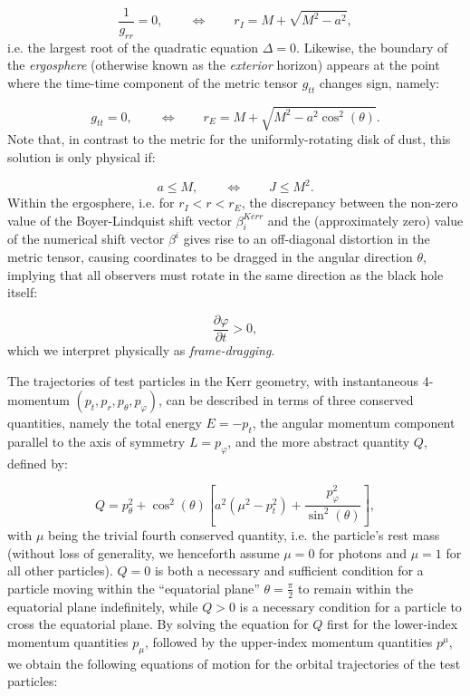 \documentclass{article}
\begin{document}
\begin{equation}
\frac{1}{g_{r r}} = 0, \qquad \iff \qquad r_I = M + \sqrt{M^2 - a^2},
\end{equation}
i.e. the largest root of the quadratic equation ${\Delta = 0}$. Likewise, the boundary of the \textit{ergosphere} (otherwise known as the \textit{exterior} horizon) appears at the point where the time-time component of the metric tensor ${g_{t t}}$ changes sign, namely:

\begin{equation}
g_{t t} = 0, \qquad \iff \qquad r_E = M + \sqrt{M^2 - a^2 \cos^2 \left( \theta \right)}.
\end{equation}
Note that, in contrast to the metric for the uniformly-rotating disk of dust, this solution is only physical if:

\begin{equation}
a \leq M, \qquad \iff \qquad J \leq M^2.
\end{equation}
Within the ergosphere, i.e. for ${r_I < r < r_E}$, the discrepancy between the non-zero value of the Boyer-Lindquist shift vector ${\beta_{i}^{Kerr}}$ and the (approximately zero) value of the numerical shift vector ${\beta^i}$ gives rise to an off-diagonal distortion in the metric tensor, causing coordinates to be dragged in the angular direction ${\theta}$, implying that all observers must rotate in the same direction as the black hole itself:

\begin{equation}
\frac{\partial \varphi}{\partial t} > 0,
\end{equation}
which we interpret physically as \textit{frame-dragging}.

The trajectories of test particles in the Kerr geometry, with instantaneous 4-momentum ${\left( p_t, p_r, p_{\theta}, p_{\varphi} \right)}$, can be described in terms of three conserved quantities, namely the total energy ${E = - p_t}$, the angular momentum component parallel to the axis of symmetry ${L = p_{\varphi}}$, and the more abstract quantity $Q$, defined by:

\begin{equation}
Q = p_{\theta}^{2} + \cos^2 \left( \theta \right) \left[ a^2 \left( \mu^2 - p_{t}^{2} \right) + 
\frac{p_{\varphi}^{2}}{\sin^2 \left( \theta \right)} \right],
\end{equation}
with ${\mu}$ being the trivial fourth conserved quantity, i.e. the particle's rest mass (without loss of generality, we henceforth assume ${\mu = 0}$ for photons and ${\mu = 1}$ for all other particles). ${Q = 0}$ is both a necessary and sufficient condition for a particle moving within the ``equatorial plane'' ${\theta = \frac{\pi}{2}}$ to remain within the equatorial plane indefinitely, while ${Q > 0}$ is a necessary condition for a particle to cross the equatorial plane. By solving the equation for $Q$ first for the lower-index momentum quantities ${p_{\mu}}$, followed by the upper-index momentum quantities ${p^{\mu}}$, we obtain the following equations of motion for the orbital trajectories of the test particles:
\end{document}
